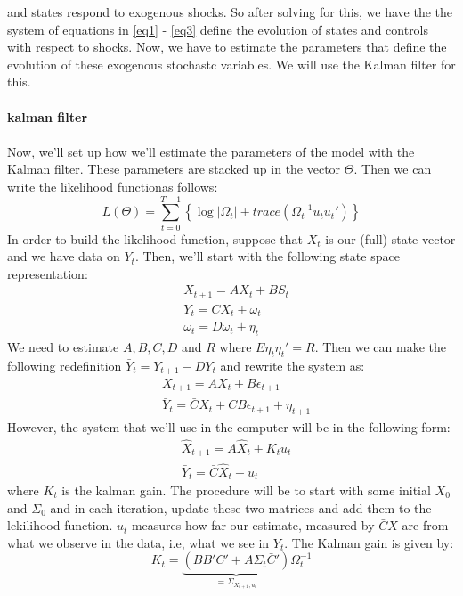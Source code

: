 \documentclass{article} %
\begin{document}
and states respond to exogenous shocks. So after solving for this, we
have the the system of equations in \ref{eq1} - \ref{eq3} define the
evolution of states and controls with respect to shocks. Now, we have
to estimate the parameters that define the evolution of these
exogenous stochastc variables. We will use the Kalman filter for
this.
\\
\\
\textbf{kalman filter}
\\
\\
Now, we'll set up how we'll estimate the parameters of the model with
the Kalman filter. These parameters are stacked up in the vector
$\Theta$. Then we can write the likelihood functionas follows:
\begin{equation*}
  L(\Theta) = \sum_{t=0}^{T-1} \left\{ \log |\Omega_t| + trace\left(\Omega_t^{-1} u_t u_t' \right) \right\}
\end{equation*}
In order to build the likelihood function, suppose that $X_t$ is our
(full) state vector and we have data on $Y_t$. Then, we'll start with the
following state space representation:
\begin{align}
& X_{t+1} = A X_t + B S_t \label{eq1} \\
& Y_t = C X_t + \omega_t \label{eq2} \\
& \omega_t = D \omega_t +  \eta_t \label{eq3}
\end{align}
We need to estimate $A,B,C,D$ and $R$ where $E\eta_t \eta_t' = R$. Then
we can make the following redefinition $\bar{Y}_{t} = Y_{t+1} - DY_t$
and rewrite the system as:
\begin{align}
& X_{t+1} = A X_t + B \epsilon_{t+1} \label{eq6} \\
& \bar{Y}_t = \bar{C} X_t + C B \epsilon_{t+1} +  \eta_{t+1} \label{eq7}
\end{align}
However, the system that we'll use in the computer will be in the
following form:
\begin{align*}
& \hat{X}_{t+1} = A \hat{X}_t + K_t u_t  \\
& \bar{Y}_t = \bar{C} \hat{X}_t + u_t 
\end{align*}
where $K_t$ is the kalman gain. The procedure will be to start with
some initial $X_0$ and $\Sigma_0$ and in each iteration, update these
two matrices and add them to the lekilihood function. $u_t$ measures
how far our estimate, measured by $\bar{C}X$ are from what we observe
in the data, i.e, what we see in $Y_t$. The Kalman gain is given by:
\begin{equation*}
  K_t = \underbrace{(BB'C' + A \Sigma_t \bar{C}')}_{=\Sigma_{X_{t+1},u_t}} \Omega_t^{-1}
\end{equation*}
\end{document}
